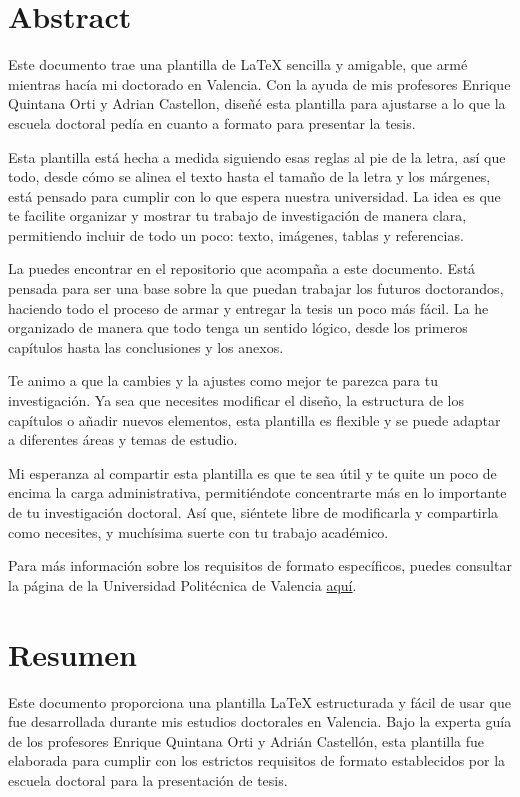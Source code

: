 \chapter*{Abstract}
Este documento trae una plantilla de \LaTeX{} sencilla y amigable, que armé mientras hacía mi doctorado en Valencia. Con la ayuda de mis profesores Enrique Quintana Orti y Adrian Castellon, diseñé esta plantilla para ajustarse a lo que la escuela doctoral pedía en cuanto a formato para presentar la tesis.

Esta plantilla está hecha a medida siguiendo esas reglas al pie de la letra, así que todo, desde cómo se alinea el texto hasta el tamaño de la letra y los márgenes, está pensado para cumplir con lo que espera nuestra universidad. La idea es que te facilite organizar y mostrar tu trabajo de investigación de manera clara, permitiendo incluir de todo un poco: texto, imágenes, tablas y referencias.

La puedes encontrar en el repositorio que acompaña a este documento. Está pensada para ser una base sobre la que puedan trabajar los futuros doctorandos, haciendo todo el proceso de armar y entregar la tesis un poco más fácil. La he organizado de manera que todo tenga un sentido lógico, desde los primeros capítulos hasta las conclusiones y los anexos.

Te animo a que la cambies y la ajustes como mejor te parezca para tu investigación. Ya sea que necesites modificar el diseño, la estructura de los capítulos o añadir nuevos elementos, esta plantilla es flexible y se puede adaptar a diferentes áreas y temas de estudio.

Mi esperanza al compartir esta plantilla es que te sea útil y te quite un poco de encima la carga administrativa, permitiéndote concentrarte más en lo importante de tu investigación doctoral. Así que, siéntete libre de modificarla y compartirla como necesites, y muchísima suerte con tu trabajo académico.

Para más información sobre los requisitos de formato específicos, puedes consultar la página de la Universidad Politécnica de Valencia \href{https://www.upv.es/contenidos/DOCINF/info/}{aquí}.



\chapter*{Resumen}
Este documento proporciona una plantilla LaTeX estructurada y fácil de usar que fue desarrollada durante mis estudios doctorales en Valencia. Bajo la experta guía de los profesores Enrique Quintana Orti y Adrián Castellón, esta plantilla fue elaborada para cumplir con los estrictos requisitos de formato establecidos por la escuela doctoral para la presentación de tesis.

